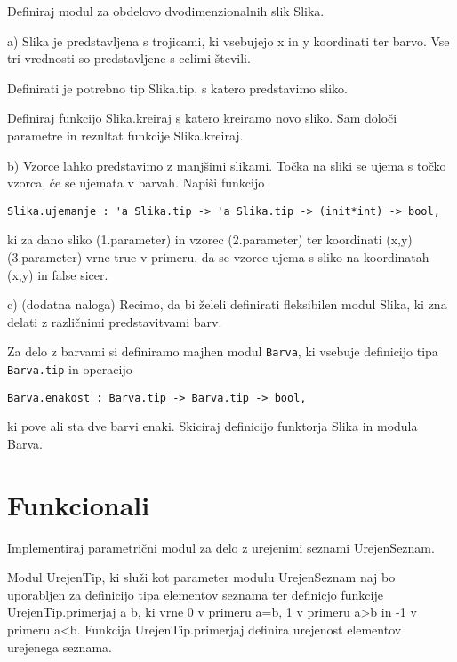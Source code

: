 \begin{ex}
Definiraj modul za obdelovo dvodimenzionalnih slik Slika. 

a) Slika je predstavljena s trojicami, ki vsebujejo x in y koordinati ter barvo. Vse tri vrednosti so predstavljene s celimi \v stevili.   

Definirati je potrebno tip Slika.tip, s katero predstavimo sliko.

Definiraj funkcijo Slika.kreiraj s katero kreiramo novo sliko. Sam dolo\v ci parametre in rezultat funkcije Slika.kreiraj. 

b) Vzorce lahko predstavimo z manj\v simi slikami. To\v cka na sliki se ujema s to\v cko vzorca, \v ce se ujemata v barvah. Napi\v si funkcijo 
\begin{lstlisting}
Slika.ujemanje : 'a Slika.tip -> 'a Slika.tip -> (init*int) -> bool, 
\end{lstlisting}

ki za dano sliko (1.parameter) in vzorec (2.parameter) ter koordinati (x,y) (3.parameter) vrne true v primeru, da se vzorec ujema s sliko na koordinatah (x,y) in false sicer.

c) (dodatna naloga) Recimo, da bi \v zeleli definirati fleksibilen modul Slika, ki zna delati z razli\v cnimi predstavitvami barv. 

Za delo z barvami si definiramo majhen modul \lstinline{Barva}, ki vsebuje definicijo tipa \lstinline{Barva.tip} in operacijo 
\begin{lstlisting}
Barva.enakost : Barva.tip -> Barva.tip -> bool, 
\end{lstlisting}
ki pove ali sta dve barvi enaki. 
Skiciraj definicijo funktorja Slika in modula Barva.
\end{ex}




\section{Funkcionali}



\begin{ex}
Implementiraj parametri\v cni modul za delo z urejenimi seznami UrejenSeznam. 

Modul UrejenTip, ki slu\v zi kot parameter modulu UrejenSeznam naj bo uporabljen za definicijo tipa elementov seznama ter definicjo funkcije UrejenTip.primerjaj a b, ki vrne 0 v primeru a=b, 1 v primeru a>b in -1 v primeru a<b. Funkcija UrejenTip.primerjaj definira urejenost elementov urejenega seznama.
\end{ex}



